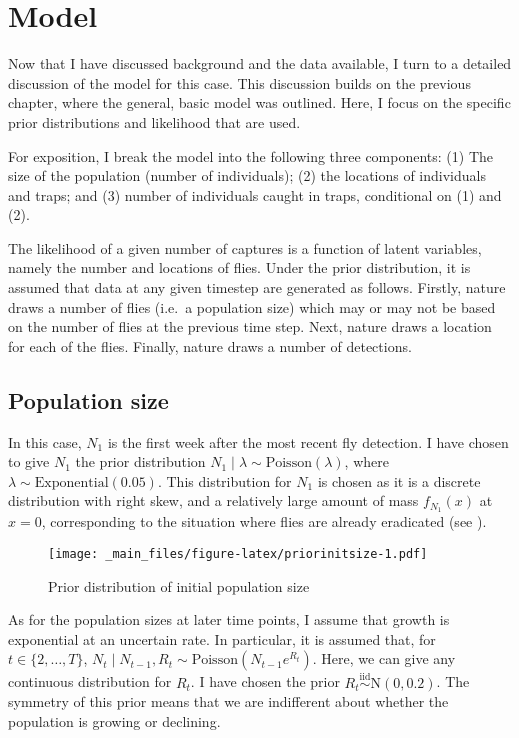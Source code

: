 \documentclass[
  oneside]{book}
\begin{document}
\hypertarget{model}{%
\section{Model}\label{model}}

Now that I have discussed background and the data available, I turn to a detailed discussion of the model for this case. This discussion builds on the previous chapter, where the general, basic model was outlined. Here, I focus on the specific prior distributions and likelihood that are used.

For exposition, I break the model into the following three components: (1) The size of the population (number of individuals); (2) the locations of individuals and traps; and (3) number of individuals caught in traps, conditional on (1) and (2).

The likelihood of a given number of captures is a function of latent variables, namely the number and locations of flies. Under the prior distribution, it is assumed that data at any given timestep are generated as follows. Firstly, nature draws a number of flies (i.e.~a population size) which may or may not be based on the number of flies at the previous time step. Next, nature draws a location for each of the flies. Finally, nature draws a number of detections.

\hypertarget{population-size-1}{%
\subsection{Population size}\label{population-size-1}}

In this case, \(N_1\) is the first week after the most recent fly detection. I have chosen to give \(N_1\) the prior distribution \(N_1 \mid \lambda \sim \mathrm{Poisson}(\lambda)\), where \(\lambda \sim \mathrm{Exponential}(0.05)\). This distribution for \(N_1\) is chosen as it is a discrete distribution with right skew, and a relatively large amount of mass \(f_{N_1}(x)\) at \(x = 0\), corresponding to the situation where flies are already eradicated (see \citet{priorinitsize}).

\begin{figure}
\centering
\texttt{[image: \_main\_files/figure-latex/priorinitsize-1.pdf]}
\caption{\label{fig:priorinitsize}Prior distribution of initial population size}
\end{figure}

As for the population sizes at later time points, I assume that growth is exponential at an uncertain rate. In particular, it is assumed that, for \(t \in \{2, \ldots, T\}\), \(N_t \mid N_{t-1}, R_t \sim \mathrm{Poisson}(N_{t-1} e^{R_t})\). Here, we can give any continuous distribution for \(R_t\). I have chosen the prior \(R_t \stackrel{\text{iid}} \sim \mathrm N(0, 0.2)\). The symmetry of this prior means that we are indifferent about whether the population is growing or declining.
\end{document}
